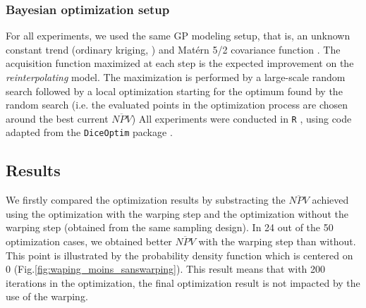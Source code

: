 \subsubsection{Bayesian optimization setup}
For all experiments, we used the same GP modeling setup, that is, an unknown constant trend (ordinary kriging, \cite{matheron1963principles}) and 
Mat\'ern 5/2 covariance function \cite[][Chapter 4]{Rasmussen2006}. The acquisition function maximized at each step is the expected improvement on the 
\textit{reinterpolating} model. The maximization is performed by a large-scale random search followed by a local optimization starting for the optimum found by the random search (i.e. the evaluated points in the optimization process are chosen around the best current $\overline{NPV}$)
All experiments were conducted in \texttt{R} \cite{R2018}, using code adapted from the \texttt{DiceOptim} package \cite{picheny2014noisy}.

\subsection{Results}
We firstly compared the optimization results by substracting the $\overline{NPV}$ achieved using the optimization with the warping step and the optimization without the warping step (obtained from the same sampling design). 
In 24 out of the 50 optimization cases, we obtained better $\overline{NPV}$ with the warping step than without. This point is illustrated by the probability density function which is centered on 0 (Fig.\ref{fig:waping_moins_sanswarping}).
This result means that with 200 iterations in the optimization, the final optimization result is not impacted by the use of the warping.

